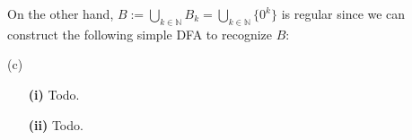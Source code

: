 On the other hand, \( B := \bigcup_{k \in \mathbb{N}} B_k = \bigcup_{k \in \mathbb{N}} \{0^k\} \) is regular since we can construct the following simple DFA to recognize \( B \):

\begin{center}
\end{center}

(c)

\begin{enumerate}
    \item[\textbf{(i)}] Todo.

    \item[\textbf{(ii)}] Todo.
\end{enumerate}


